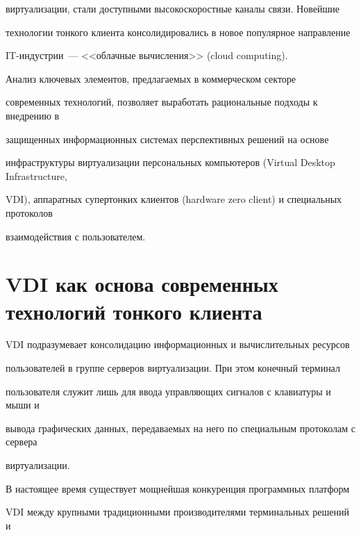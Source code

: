 виртуализации, стали доступными высокоскоростные каналы связи. Новейшие 


технологии тонкого клиента консолидировались в новое популярное направление 


       IT-ин\-дуст\-рии~--- <<облачные вычисления>> (cloud computing). 


       


       Анализ ключевых элементов, предлагаемых в коммерческом секторе 


современных технологий, позволяет выработать рациональные подходы к внедрению в 


защищенных информационных системах перспективных решений на основе 


инфраструктуры виртуализации персональных компьютеров (Virtual Desktop Infrastructure, 


VDI), аппаратных супертонких клиентов (hardware zero client) и специальных протоколов 


взаимодействия с пользователем.










\section{VDI как основа современных технологий тонкого клиента}


       


       VDI подразумевает консолидацию информационных и вычислительных ресурсов 


пользователей в группе серверов виртуализации. При этом конечный терминал 


пользователя служит лишь для ввода управляющих сигналов с клавиатуры и мыши и 


вывода графических данных, передаваемых на него по специальным протоколам с сервера 


виртуализации.


       


       В настоящее время существует мощнейшая конкуренция программных платформ 


VDI между крупными традиционными производителями терминальных решений и 



